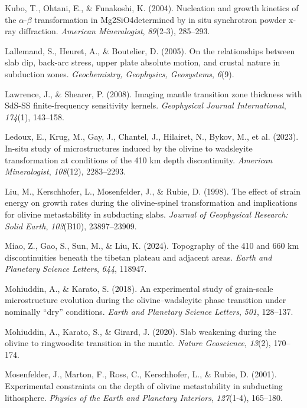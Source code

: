 \documentclass[draft,linenumbers]{agujournal2019}
\newlength{\cslhangindent}
\newenvironment{CSLReferences}[2]
 {\begin{list}{}{
  \setlength{\itemindent}{0pt}
  \setlength{\leftmargin}{0pt}
  \setlength{\parsep}{0pt}
  \ifodd #1
   \setlength{\leftmargin}{\cslhangindent}
   \setlength{\itemindent}{-\cslhangindent}
  \fi
  \setlength{\itemsep}{#2\baselineskip}
  }
  \item\relax}
 {\end{list}}
\begin{document}
\begin{CSLReferences}{1}{0}
Kubo, T., Ohtani, E., \& Funakoshi, K. (2004). Nucleation and growth
kinetics of the \(\alpha\)-\(\beta\) transformation in Mg2SiO4determined
by in situ synchrotron powder x-ray diffraction. \emph{American
Mineralogist}, \emph{89}(2-3), 285--293.

Lallemand, S., Heuret, A., \& Boutelier, D. (2005). On the relationships
between slab dip, back-arc stress, upper plate absolute motion, and
crustal nature in subduction zones. \emph{Geochemistry, Geophysics,
Geosystems}, \emph{6}(9).

Lawrence, J., \& Shearer, P. (2008). Imaging mantle transition zone
thickness with SdS-SS finite-frequency sensitivity kernels.
\emph{Geophysical Journal International}, \emph{174}(1), 143--158.

{Ledoux, E., Krug, M., Gay, J., Chantel, J., Hilairet, N., Bykov, M., et
al.} (2023). In-situ study of microstructures induced by the olivine to
wadsleyite transformation at conditions of the 410 km depth
discontinuity. \emph{American Mineralogist}, \emph{108}(12), 2283--2293.

Liu, M., Kerschhofer, L., Mosenfelder, J., \& Rubie, D. (1998). The
effect of strain energy on growth rates during the olivine-spinel
transformation and implications for olivine metastability in subducting
slabs. \emph{Journal of Geophysical Research: Solid Earth},
\emph{103}(B10), 23897--23909.

Miao, Z., Gao, S., Sun, M., \& Liu, K. (2024). Topography of the 410 and
660 km discontinuities beneath the tibetan plateau and adjacent areas.
\emph{Earth and Planetary Science Letters}, \emph{644}, 118947.

Mohiuddin, A., \& Karato, S. (2018). An experimental study of
grain-scale microstructure evolution during the olivine--wadsleyite
phase transition under nominally {``dry''} conditions. \emph{Earth and
Planetary Science Letters}, \emph{501}, 128--137.

Mohiuddin, A., Karato, S., \& Girard, J. (2020). Slab weakening during
the olivine to ringwoodite transition in the mantle. \emph{Nature
Geoscience}, \emph{13}(2), 170--174.

Mosenfelder, J., Marton, F., Ross, C., Kerschhofer, L., \& Rubie, D.
(2001). Experimental constraints on the depth of olivine metastability
in subducting lithosphere. \emph{Physics of the Earth and Planetary
Interiors}, \emph{127}(1-4), 165--180.


\end{CSLReferences}
\end{document}
